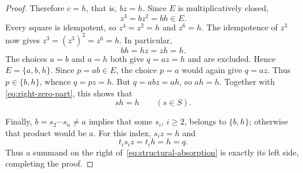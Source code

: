 \documentclass[11pt,reqno]{amsart}
\theoremstyle{remark}
\numberwithin{equation}{section}
\begin{document}
\begin{proof}
Therefore $c=h$, that is, $bz=h$. Since $E$ is multiplicatively closed,
\[
z^3=bz^2=bh\in E.
\]
Every square is idempotent, so $z^4=z^2=h$ and $z^6=h$.
The idempotence of $z^3$ now gives $z^3=(z^3)^2=z^6=h$. In particular,
\begin{equation}\label{eq:right-zero-part}
bh=hz=zh=h.
\end{equation}
The choices $a=b$ and $a=h$ both give $q=az=h$ and are excluded.
Hence $E=\{a,b,h\}$. Since $p=ab\in E$, the choice $p=a$ would
again give $q=az$. Thus $p\in\{b,h\}$, whence $q=pz=h$.
But $q=abz=ah$, so $ah=h$. Together with
\eqref{eq:right-zero-part}, this shows that
\begin{equation}\label{eq:right-zero}
sh=h\qquad(s\in S).
\end{equation}

Finally, $b=s_2\cdots s_n\ne a$ implies that some $s_i$, $i\geq2$,
belongs to $\{b,h\}$; otherwise that product would be $a$.
For this index, $s_i z=h$ and
\[
t_i s_i z=t_i h=h=q.
\]
Thus a summand on the right of~\eqref{eq:structural-absorption} is
exactly its left side, completing the proof.
\end{proof}
\end{document}
